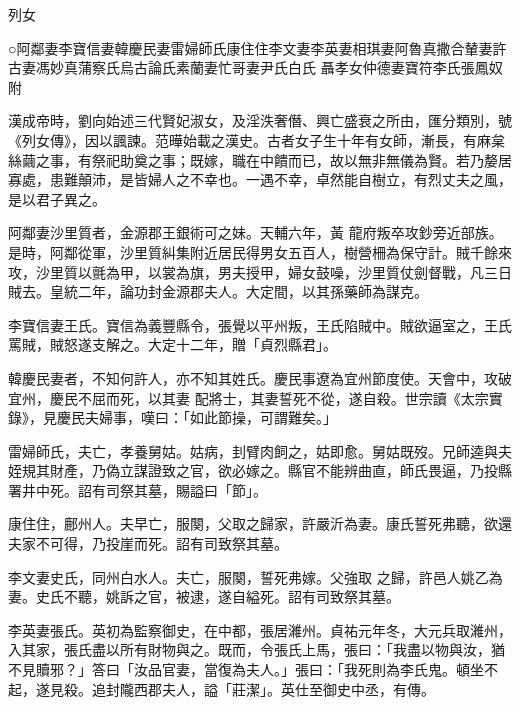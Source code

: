 
\begin{pinyinscope}

 列女



 ○阿鄰妻李寶信妻韓慶民妻雷婦師氏康住住李文妻李英妻相琪妻阿魯真撒合輦妻許古妻馮妙真蒲察氏烏古論氏素蘭妻忙哥妻尹氏白氏
 聶孝女仲德妻寶符李氏張鳳奴附



 漢成帝時，劉向始述三代賢妃淑女，及淫泆奢僭、興亡盛衰之所由，匯分類別，號《列女傳》，因以諷諫。范曄始載之漢史。古者女子生十年有女師，漸長，有麻枲絲繭之事，有祭祀助奠之事；既嫁，職在中饋而已，故以無非無儀為賢。若乃嫠居寡處，患難顛沛，是皆婦人之不幸也。一遇不幸，卓然能自樹立，有烈丈夫之風，是以君子異之。



 阿鄰妻沙里質者，金源郡王銀術可之妹。天輔六年，黃
 龍府叛卒攻鈔旁近部族。是時，阿鄰從軍，沙里質糾集附近居民得男女五百人，樹營柵為保守計。賊千餘來攻，沙里質以氈為甲，以裳為旗，男夫授甲，婦女鼓噪，沙里質仗劍督戰，凡三日賊去。皇統二年，論功封金源郡夫人。大定間，以其孫藥師為謀克。



 李寶信妻王氏。寶信為義豐縣令，張覺以平州叛，王氏陷賊中。賊欲逼室之，王氏罵賊，賊怒遂支解之。大定十二年，贈「貞烈縣君」。



 韓慶民妻者，不知何許人，亦不知其姓氏。慶民事遼為宜州節度使。天會中，攻破宜州，慶民不屈而死，以其妻
 配將士，其妻誓死不從，遂自殺。世宗讀《太宗實錄》，見慶民夫婦事，嘆曰：「如此節操，可謂難矣。」



 雷婦師氏，夫亡，孝養舅姑。姑病，刲臂肉飼之，姑即愈。舅姑既歿。兄師逵與夫姪規其財產，乃偽立謀證致之官，欲必嫁之。縣官不能辨曲直，師氏畏逼，乃投縣署井中死。詔有司祭其墓，賜謚曰「節」。



 康住住，鄜州人。夫早亡，服闋，父取之歸家，許嚴沂為妻。康氏誓死弗聽，欲還夫家不可得，乃投崖而死。詔有司致祭其墓。



 李文妻史氏，同州白水人。夫亡，服闋，誓死弗嫁。父強取
 之歸，許邑人姚乙為妻。史氏不聽，姚訴之官，被逮，遂自縊死。詔有司致祭其墓。



 李英妻張氏。英初為監察御史，在中都，張居濰州。貞祐元年冬，大元兵取濰州，入其家，張氏盡以所有財物與之。既而，令張氏上馬，張曰：「我盡以物與汝，猶不見贖邪？」答曰「汝品官妻，當復為夫人。」張曰：「我死則為李氏鬼。頓坐不起，遂見殺。追封隴西郡夫人，謚「莊潔」。英仕至御史中丞，有傳。




\end{pinyinscope}
